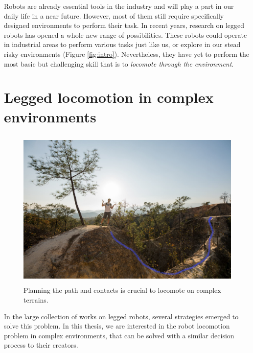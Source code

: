 



Robots are already essential tools in the industry and will play a part in our daily life in a near future.
However, most of them still require specifically designed environments to perform their task.
In recent years, research on legged robots has opened a whole new range of possibilities. %
These robots could operate in industrial areas to perform various tasks just like us, or explore in our stead risky environments (Figure \ref{fig:intro}).
Nevertheless, they have yet to perform the most basic but challenging skill that is to \textit{locomote through the environment}.

\section{Legged locomotion in complex environments}
\begin{figure}[h]
    \centering
    \includegraphics[width=\textwidth, height=8cm, trim={10cm 0 0 8cm}, clip]{Figures/Chapter_INTRO/moi_chemin.jpg}
    \caption{Planning the path and contacts is crucial to locomote on complex terrains.}
    \label{fig:intro:moi_chemin}
\end{figure}
In the large collection of works on legged robots, several strategies emerged to solve this problem.
In this thesis, we are interested in the robot locomotion problem in complex environments, that can be solved with a similar decision process to their creators.

